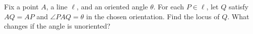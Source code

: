 Fix a point $A$, a line $\ell$, and an oriented angle $\theta$. For each $P\in\ell$, let $Q$ satisfy $AQ=AP$ and $\angle PAQ=\theta$ in the chosen orientation. Find the locus of $Q$. What changes if the angle is unoriented?

